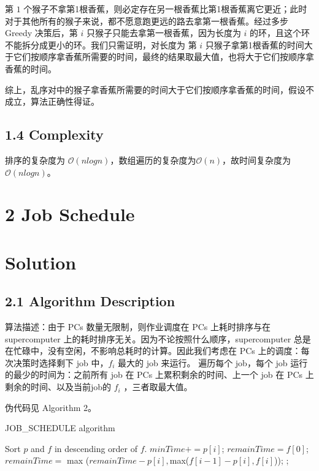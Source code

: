 \documentclass[UTF8]{ctexart}
\begin{document}
第 $1$ 个猴子不拿第1根香蕉，则必定存在另一根香蕉比第1根香蕉离它更近；此时对于其他所有的猴子来说，都不愿意跑更远的路去拿第一根香蕉。经过多步 Greedy 决策后，第 $i$ 只猴子只能去拿第一根香蕉，因为长度为 $i$ 的环，且这个环不能拆分成更小的环。我们只需证明，对长度为
第 $i$ 只猴子拿第1根香蕉的时间大于它们按顺序拿香蕉所需要的时间，最终的结果取最大值，也将大于它们按顺序拿香蕉的时间。

综上，乱序对中的猴子拿香蕉所需要的时间大于它们按顺序拿香蕉的时间，假设不成立，算法正确性得证。
\subsection*{1.4 Complexity}
排序的复杂度为 $\mathcal{O}(nlogn)$，数组遍历的复杂度为$\mathcal{O}(n)$，故时间复杂度为$\mathcal{O}(nlogn)$。

\section*{2 Job Schedule}


\section*{Solution}
\subsection*{2.1 Algorithm Description} 
算法描述：由于 PCs 数量无限制，则作业调度在 PCs 上耗时排序与在 supercomputer 上的耗时排序无关。因为不论按照什么顺序，supercomputer 总是在忙碌中，没有空闲，不影响总耗时的计算。因此我们考虑在 PCs 上的调度：每次决策时选择剩下 job 中，$f_i$ 最大的 job 来运行。
遍历每个 job，每个 job 运行的最少的时间为：之前所有 job 在 PCs 上累积剩余的时间、上一个 job 在 PCs 上剩余的时间、以及当前job的 $f_i$ ，三者取最大值。

伪代码见 Algorithm 2。
\begin{algorithm}[h]
	\caption{JOB\_SCHEDULE algorithm}
	\begin{algorithmic}[1]
		\State Sort $p$ and $f$ in descending order of $f$. 
            \State $minTime += p[i]$;
                \State $remainTime = f[0]$;
            \Else
                \State $remainTime = $ max ($remainTime-p[i],$max($f[i-1]-p[i], f[i]$));
            \EndIf
        \EndFor
		\State {} ;
		\EndFunction
	\end{algorithmic}
\end{algorithm}
\end{document}
